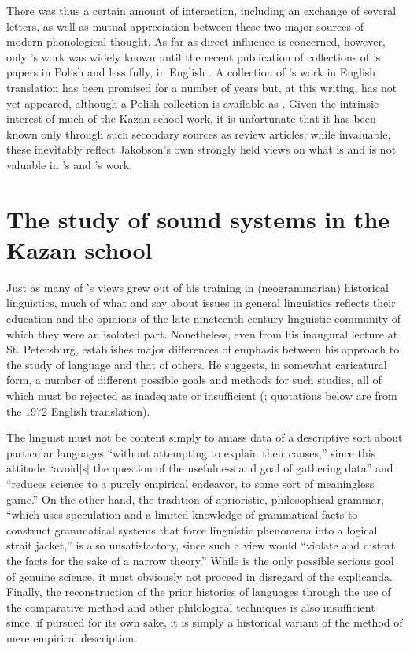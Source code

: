 There was thus a certain amount of interaction, including an exchange
of several letters, as well as mutual appreciation between these two
major sources of modern phonological thought. As far as direct
influence is concerned, however, only {\Saussure}'s work was widely known
until the recent publication of collections of {\Baudouin}'s papers in
Polish \citep{baudouin74f:selected-works} and less fully, in {English}
\citep{baudouin72:stankiewicz-anthology}. A collection of {\Kruszewski}'s
work in {English} translation has been promised for a number of years
but, at this writing, has not yet appeared, although a Polish
collection is available as \citealt{kruszewski67:selected}. Given the
intrinsic interest of much of the Kazan school work, it is unfortunate
that it has been known only through such secondary sources as
review articles; while invaluable, these inevitably reflect Jakobson's
own strongly held views on what is and is not valuable in {\Baudouin}'s
and {\Kruszewski}'s work.

\section{The study of sound systems in the Kazan school}

Just as many of {\Saussure}'s views grew out of his training in
(neogrammarian) historical linguistics, much of what {\Baudouin} and
{\Kruszewski} say about issues in general linguistics reflects their
education and the opinions of the late-nine\-teenth-century linguistic
community of which they were an isolated part. None\-the\-less, even from
his inaugural lecture at St. Petersburg, {\Baudouin} establishes major
differences of emphasis between his approach to the study of language
and that of others. He suggests, in somewhat caricatural form, a
number of different possible goals and methods for such studies, all
of which must be rejected as inadequate or insufficient
(\citet{baudouin71:general-remarks}; quotations below are from the
1972 {English} translation).

The linguist must not be content simply to amass data of a descriptive
sort about particular languages ``without attempting to explain their
causes,'' since this attitude ``avoid[s] the question of the usefulness
and goal of gathering data'' and ``reduces science to a purely empirical
endeavor, to some sort of meaningless game.'' On the other hand, the
tradition of aprioristic, philosophical grammar, ``which uses
speculation and a limited knowledge of grammatical facts to construct
grammatical systems that force linguistic phenomena into a logical
strait jacket,'' is also unsatisfactory, since such a view would
``violate and distort the facts for the sake of a narrow theory.'' While
 is the only possible serious goal of genuine science, it
must obviously not proceed in disregard of the explicanda. Finally,
the reconstruction of the prior histories of languages through the use
of the comparative method and other philological techniques is also
insufficient since, if pursued for its own sake, it is simply a
historical variant of the method of mere empirical description.


